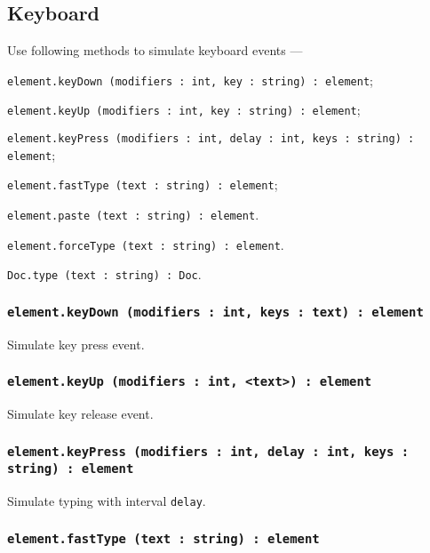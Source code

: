 \subsection{Keyboard}

Use following methods to simulate keyboard events —
\begin{icItems}
	\item \texttt{element.keyDown (modifiers : int, key : string) : element};
	\item \texttt{element.keyUp (modifiers : int, key : string) : element};
	\item \texttt{element.keyPress (modifiers : int, delay : int, keys : string) : element};
	\item \texttt{element.fastType (text : string) : element};
	\item \texttt{element.paste (text : string) : element}.
	\item \texttt{element.forceType (text : string) : element}.
	\item \texttt{Doc.type (text : string) : Doc}.
\end{icItems}

\subsubsection{\texttt{element.keyDown (modifiers : int, keys : text) : element}}

Simulate key press event.

\subsubsection{\texttt{element.keyUp (modifiers : int, <text>) : element}}

Simulate key release event.

\subsubsection{\texttt{element.keyPress (modifiers : int, delay : int, keys : string) : element}}

Simulate typing with interval \texttt{delay}.

\subsubsection{\texttt{element.fastType (text : string) : element}}

